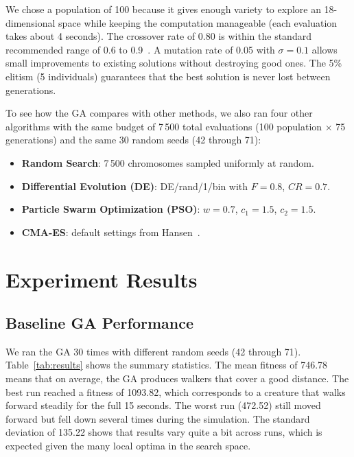 \documentclass[11pt,a4paper]{article}
\begin{document}
We chose a population of 100 because it gives enough variety to explore an 18-dimensional space while keeping the computation manageable (each evaluation takes about 4 seconds). The crossover rate of 0.80 is within the standard recommended range of 0.6 to 0.9~\cite{katoch2021}. A mutation rate of 0.05 with $\sigma = 0.1$ allows small improvements to existing solutions without destroying good ones. The 5\% elitism (5 individuals) guarantees that the best solution is never lost between generations.

To see how the GA compares with other methods, we also ran four other algorithms with the same budget of 7\,500 total evaluations (100 population $\times$ 75 generations) and the same 30 random seeds (42 through 71):
\begin{itemize}[nosep,topsep=2pt]
    \item \textbf{Random Search}: 7\,500 chromosomes sampled uniformly at random.
    \item \textbf{Differential Evolution (DE)}: DE/rand/1/bin with $F = 0.8$, $CR = 0.7$.
    \item \textbf{Particle Swarm Optimization (PSO)}: $w = 0.7$, $c_1 = 1.5$, $c_2 = 1.5$.
    \item \textbf{CMA-ES}: default settings from Hansen~\cite{hansen2016}.
\end{itemize}

\section{Experiment Results}

\subsection{Baseline GA Performance}

We ran the GA 30 times with different random seeds (42 through 71). Table~\ref{tab:results} shows the summary statistics. The mean fitness of 746.78 means that on average, the GA produces walkers that cover a good distance. The best run reached a fitness of 1093.82, which corresponds to a creature that walks forward steadily for the full 15 seconds. The worst run (472.52) still moved forward but fell down several times during the simulation. The standard deviation of 135.22 shows that results vary quite a bit across runs, which is expected given the many local optima in the search space.
\end{document}
